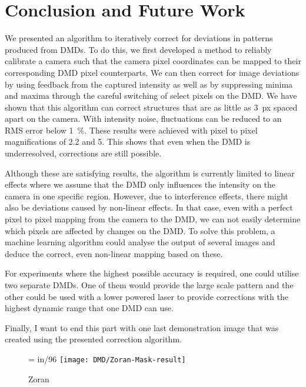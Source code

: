 

\chapter{Conclusion and Future Work}
\label{cha:dmd_future}
We presented an algorithm to iteratively correct for deviations in patterns produced from DMDs. To do this, we first developed a method to reliably calibrate a camera such that the camera pixel coordinates can be mapped to their corresponding DMD pixel counterparts. We can then correct for image deviations by using feedback from the captured intensity as well as by suppressing minima and maxima through the careful switching of select pixels on the DMD. 
We have shown that this algorithm can correct structures that are as little as \SI{3}{px} spaced apart on the camera. With intensity noise, fluctuations can be reduced to an RMS error below \SI{1}{\percent}. These results were achieved with pixel to pixel magnifications of \num{2.2} and \num{5}. This shows that even when the DMD is underresolved, corrections are still possible.

Although these are satisfying results, the algorithm is currently limited to linear effects where we assume that the DMD only influences the intensity on the camera in one specific region. However, due to interference effects, there might also be deviations caused by non-linear effects. In that case, even with a perfect pixel to pixel mapping from the camera to the DMD, we can not easily determine which pixels are affected by changes on the DMD. To solve this problem, a machine learning algorithm could analyse the output of several images and deduce the correct, even non-linear mapping based on these. 

For experiments where the highest possible accuracy is required, one could utilise two separate DMDs. One of them would provide the large scale pattern and the other could be used with a lower powered laser to provide corrections with the highest dynamic range that one DMD can use.

\pagebreak
\noindent Finally, I want to end this part with one last demonstration image that was created using the presented correction algorithm.

\begin{figure}[htbp]
    \captionsetup{list=no}
    \centering
    \pdfpxdimen= in/96\relax
    \texttt{[image: DMD/Zoran-Mask-result]}
    \caption{Zoran}
    \label{fig:zoran}
\end{figure}

